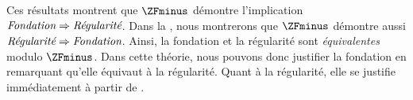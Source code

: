 \documentclass[../../../include/open-logic-section]{subfiles}
\begin{document}
Ces résultats montrent que $\ZFminus$ démontre l'implication
$\emph{Fondation}\Rightarrow\emph{Régularité}$. Dans la
, nous montrerons que
$\ZFminus$ démontre aussi
$\emph{Régularité}\Rightarrow\emph{Fondation}$. Ainsi, la fondation
et la régularité sont \emph{équivalentes} modulo $\ZFminus$. Dans
cette théorie, nous pouvons donc justifier la fondation en remarquant
qu'elle équivaut à la régularité. Quant à la régularité, elle se
justifie immédiatement à partir de \stageshier{}.
\end{document}
